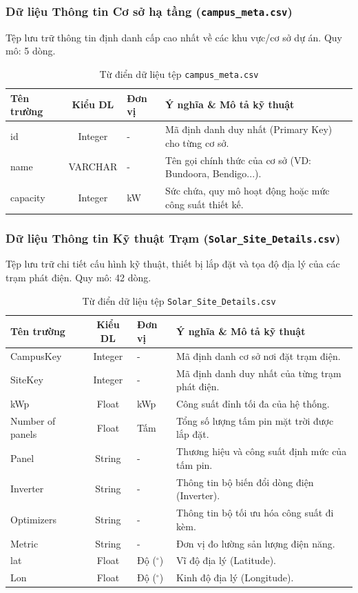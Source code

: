 \documentclass[12pt,a4paper]{article}
\begin{document}
\subsubsection{Dữ liệu Thông tin Cơ sở hạ tầng (\texttt{campus\_meta.csv})}
Tệp lưu trữ thông tin định danh cấp cao nhất về các khu vực/cơ sở dự án. Quy mô: 5 dòng.
\begin{table}[H]
\centering
\caption{Từ điển dữ liệu tệp \texttt{campus\_meta.csv}}
\renewcommand{\arraystretch}{1.4}
\begin{tabularx}{\textwidth}{p{3.5cm} c p{2cm} X}
\toprule
\textbf{Tên trường} & \textbf{Kiểu DL} & \textbf{Đơn vị} & \textbf{Ý nghĩa \& Mô tả kỹ thuật} \\
\midrule
id       & Integer & -  & Mã định danh duy nhất (Primary Key) cho từng cơ sở. \\
name     & VARCHAR  & -  & Tên gọi chính thức của cơ sở (VD: Bundoora, Bendigo...). \\
capacity & Integer & kW & Sức chứa, quy mô hoạt động hoặc mức công suất thiết kế. \\
\bottomrule
\end{tabularx}
\end{table}

\newpage
\subsubsection{Dữ liệu Thông tin Kỹ thuật Trạm (\texttt{Solar\_Site\_Details.csv})}
Tệp lưu trữ chi tiết cấu hình kỹ thuật, thiết bị lắp đặt và tọa độ địa lý của các trạm phát điện. Quy mô: 42 dòng.
\begin{table}[H]
\centering
\caption{Từ điển dữ liệu tệp \texttt{Solar\_Site\_Details.csv}}
\renewcommand{\arraystretch}{1.4}
\begin{tabularx}{\textwidth}{p{3.5cm} c p{2cm} X}
\toprule
\textbf{Tên trường} & \textbf{Kiểu DL} & \textbf{Đơn vị} & \textbf{Ý nghĩa \& Mô tả kỹ thuật} \\
\midrule
CampusKey        & Integer & -   & Mã định danh cơ sở nơi đặt trạm điện. \\
SiteKey          & Integer & -   & Mã định danh duy nhất của từng trạm phát điện. \\
kWp              & Float   & kWp & Công suất đỉnh tối đa của hệ thống. \\
Number of panels & Float   & Tấm & Tổng số lượng tấm pin mặt trời được lắp đặt. \\
Panel            & String  & -   & Thương hiệu và công suất định mức của tấm pin. \\
Inverter         & String  & -   & Thông tin bộ biến đổi dòng điện (Inverter). \\
Optimizers       & String  & -   & Thông tin bộ tối ưu hóa công suất đi kèm. \\
Metric           & String  & -   & Đơn vị đo lường sản lượng điện năng. \\
lat              & Float   & Độ ($^\circ$) & Vĩ độ địa lý (Latitude). \\
Lon              & Float   & Độ ($^\circ$) & Kinh độ địa lý (Longitude). \\
\bottomrule
\end{tabularx}
\end{table}
\end{document}
